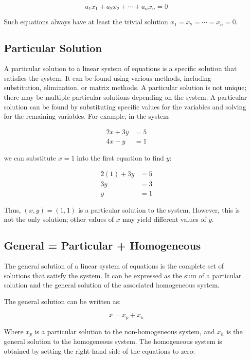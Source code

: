 \[
	a_1 x_1 + a_2 x_2 + \cdots + a_n x_n = 0
\]

Such equations always have at least the trivial solution \(x_1 = x_2 = \cdots = x_n = 0\).

\subsection{Particular Solution}

A particular solution to a linear system of equations is a specific solution that satisfies the system. 
It can be found using various methods, including substitution, elimination, or matrix methods. A 
particular solution is not unique; there may be multiple particular solutions depending on the system.
A particular solution can be found by substituting specific values for the variables and solving for the 
remaining variables. For example, in the system

\begin{align*}
	2x + 3y & = 5 \\
	4x - y  & = 1
\end{align*}

we can substitute \(x = 1\) into the first equation to find \(y\):

\begin{align*}
	2(1) + 3y & = 5 \\
	3y        & = 3 \\
	y         & = 1
\end{align*}

Thus, \((x, y) = (1, 1)\) is a particular solution to the system. However, this is not the only solution; 
other values of \(x\) may yield different values of \(y\).

\subsection{General = Particular + Homogeneous}

The general solution of a linear system of equations is the complete set of solutions that satisfy the 
system. It can be expressed as the sum of a particular solution and the general solution of the associated 
homogeneous system.

The general solution can be written as:

\[
	x = x_p + x_h
\]

Where \( x_p \) is a particular solution to the non-homogeneous system, and \( x_h \) is the general 
solution to the homogeneous system. The homogeneous system is obtained by setting the right-hand side 
of the equations to zero:

